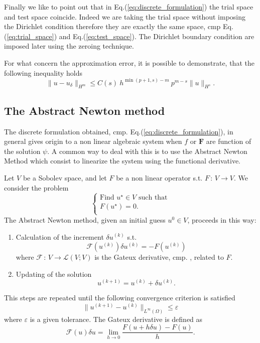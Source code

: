 Finally we like to point out that in Eq.(\ref{eq:discrete_formulation}) the trial space and test space coincide. Indeed we are taking the trial space without imposing the Dirichlet condition therefore they are exactly the same space, cmp Eq.(\ref{eq:trial_space}) and Eq.(\ref{eq:test_space}). The Dirichlet boundary condition are imposed later using the zeroing technique.
\medskip

For what concern the approximation error, it is possible to demonstrate, that the following inequality holds
\begin{equation}
  \|u-u_\delta\|_{H^m}\leq C(s)\: h^{\min(p+1,s)-m}\:p^{m-s}\|u\|_{H^s}.
\end{equation}

\subsection{The Abstract Newton method}\label{subsec:newton_method}
The discrete formulation obtained, cmp. Eq.(\ref{eq:discrete_formulation}), in general gives origin to a non linear algebraic system when $f$ or $\mathbf{F}$ are function of the solution $\psi$. A common way to deal with this is to use the Abstract Newton Method which consist to linearize the system using the functional derivative.
\medskip

Let $V$  be a Sobolev space, and let $F$ be a non linear operator s.t. $F\,:\,V\rightarrow V$. We consider the problem
\begin{equation}
  \left\{\begin{array}{ll}
    \textrm{Find $u^{\star}\in V$ such that}\\
    \textrm{$F(u^{\star})=0.$}\\
  \end{array}\right.
\end{equation}
The Abstract Newton method, given an initial guess $u^{0}\in V$, proceeds in this way:
\begin{enumerate}
\item Calculation of the increment $\delta u^{(k)}$ s.t.
\begin{equation}
  \mathcal{F}(u^{(k)})\delta u^{(k)}=-F(u^{(k)})
\end{equation}
where $\mathcal{F}\,:\,V\rightarrow\mathcal{L}(V;V)$ is the Gateux derivative, cmp. \cite{SERRA}, related to $F$.
\item Updating of the solution
\begin{equation}
  u^{(k+1)}=u^{(k)}+\delta u^{(k)}.
\end{equation}
\end{enumerate}
This steps are repeated until the following convergence criterion is satisfied
\begin{equation}
\| u^{(k+1)}-u^{(k)}\|_{L^{\infty}(\Omega)}\leq\varepsilon
\end{equation}
where $\varepsilon$ is a given tolerance. The Gateux derivative is defined as
\begin{equation}
  \mathcal{F}(u)\delta u=\lim_{h\rightarrow0}\frac{F(u+h\delta u)-F(u)}{h}.
\end{equation}

